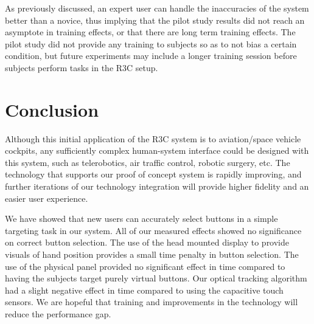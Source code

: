As previously discussed, an expert user can handle the inaccuracies of the system better than a novice, thus implying that the pilot study results did not reach an asymptote in training effects, or that there are long term training effects.
The pilot study did not provide any training to subjects so as to not bias a certain condition, but future experiments may include a longer training session before subjects perform tasks in the R3C setup.


\section{Conclusion}

Although this initial application of the R3C system is to aviation/space vehicle cockpits, any sufficiently complex human-system interface could be designed with this system, such as telerobotics, air traffic control, robotic surgery, etc.
The technology that supports our proof of concept system is rapidly improving, and further iterations of our technology integration will provide higher fidelity and an easier user experience.


We have showed that new users can accurately select buttons in a simple targeting task in our system.
All of our measured effects showed no significance on correct button selection.
The use of the head mounted display to provide visuals of hand position provides a small time penalty in button selection.
The use of the physical panel provided no significant effect in time compared to having the subjects target purely virtual buttons.
Our optical tracking algorithm had a slight negative effect in time compared to using the capacitive touch sensors.
We are hopeful that training and improvements in the technology will reduce the performance gap.

